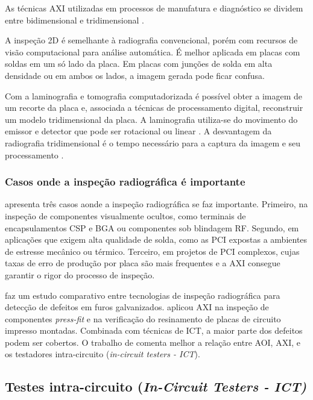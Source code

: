  As técnicas AXI utilizadas em processos de manufatura e diagnóstico se dividem entre bidimensional e tridimensional \citep{7236817, dougmcclure2000}. 

A inspeção 2D é semelhante à radiografia convencional, porém com recursos de visão computacional para análise automática. É melhor aplicada em placas com soldas em um só lado da placa. Em placas com junções de solda em alta densidade ou em ambos os lados, a imagem gerada pode ficar confusa. 

Com a laminografia e tomografia computadorizada é possível obter a imagem de um recorte da placa e, associada a técnicas de processamento digital, reconstruir um modelo tridimensional da placa. A laminografia utiliza-se do movimento do emissor e detector que pode ser rotacional \citep{7236817} ou linear \citep{6756131}. A desvantagem da radiografia tridimensional é o tempo necessário para a captura da imagem e seu processamento \citep{6756131}. 

\subsubsection{Casos onde a inspeção radiográfica é importante}

\citet{leinbach2001and} apresenta três casos aonde a inspeção radiográfica se faz importante. Primeiro, na inspeção de componentes visualmente ocultos, como terminais de encapsulamentos CSP e BGA ou componentes sob blindagem RF. Segundo, em aplicações que exigem alta qualidade de solda, como as PCI expostas a ambientes de estresse mecânico ou térmico. Terceiro, em projetos de PCI complexos, cujas taxas de erro de produção por placa são mais frequentes e a AXI consegue garantir o rigor do processo de inspeção.

\citet{7236817} faz um estudo comparativo entre tecnologias de inspeção radiográfica para detecção de defeitos em furos galvanizados. \citet{7428398} aplicou AXI na inspeção de componentes \textit{press-fit} e \citet{7428400} na verificação do resinamento de placas de circuito impresso montadas. Combinada com técnicas de ICT, a maior parte dos defeitos podem ser cobertos. O trabalho de \citet{oresjo2002use} comenta melhor a relação entre AOI, AXI, e os testadores intra-circuito (\textit{in-circuit testers - ICT}).

\subsection{Testes intra-circuito (\textit{In-Circuit Testers - ICT)}}

